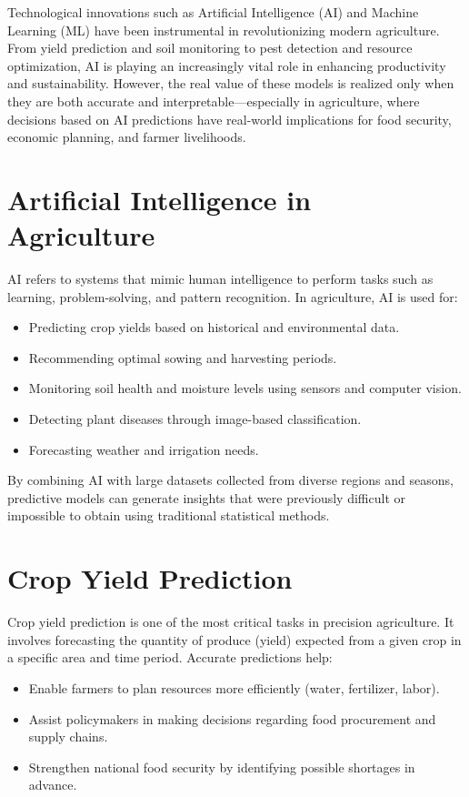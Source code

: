 \documentclass[a4paper,11pt,oneside]{book}
\begin{document}
Technological innovations such as Artificial Intelligence (AI) and Machine Learning (ML) have been instrumental in revolutionizing modern agriculture. From yield prediction and soil monitoring to pest detection and resource optimization, AI is playing an increasingly vital role in enhancing productivity and sustainability. However, the real value of these models is realized only when they are both accurate and interpretable—especially in agriculture, where decisions based on AI predictions have real-world implications for food security, economic planning, and farmer livelihoods.

\section{Artificial Intelligence in Agriculture}

AI refers to systems that mimic human intelligence to perform tasks such as learning, problem-solving, and pattern recognition. In agriculture, AI is used for:
\begin{itemize}
    \item Predicting crop yields based on historical and environmental data.
    \item Recommending optimal sowing and harvesting periods.
    \item Monitoring soil health and moisture levels using sensors and computer vision.
    \item Detecting plant diseases through image-based classification.
    \item Forecasting weather and irrigation needs.
\end{itemize}

By combining AI with large datasets collected from diverse regions and seasons, predictive models can generate insights that were previously difficult or impossible to obtain using traditional statistical methods.

\section{Crop Yield Prediction}

Crop yield prediction is one of the most critical tasks in precision agriculture. It involves forecasting the quantity of produce (yield) expected from a given crop in a specific area and time period. Accurate predictions help:
\begin{itemize}
    \item Enable farmers to plan resources more efficiently (water, fertilizer, labor).
    \item Assist policymakers in making decisions regarding food procurement and supply chains.
    \item Strengthen national food security by identifying possible shortages in advance.
\end{itemize}
\end{document}
